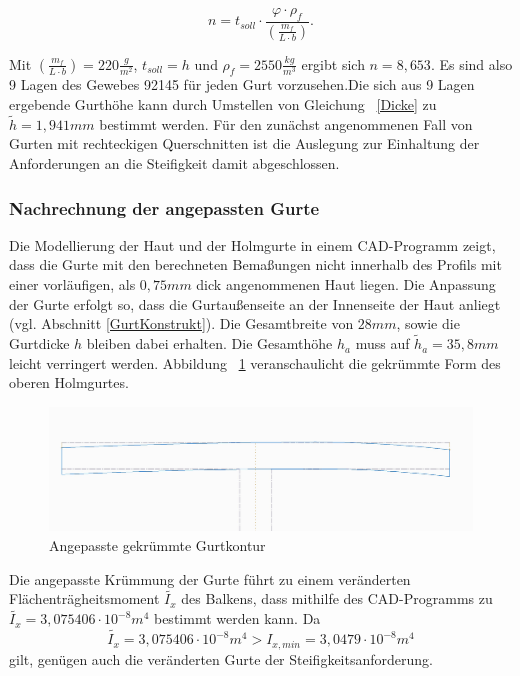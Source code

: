 \begin{equation}\label{Dicke}
	n=t_{soll}\cdot \frac{\varphi\cdot\rho_{f}}{\left(\frac{m_{f}}{L\cdot b}\right)}.
\end{equation}

\noindent Mit $ \left(\frac{m_{f}}{L\cdot b}\right) = 220\frac{g}{m^{2}} $, $ t_{soll}=h $ und $ \rho_{f}=2550\frac{kg}{m^{3}} $ ergibt sich $ n=8,653 $. Es sind also 9 Lagen des Gewebes 92145 für jeden Gurt vorzusehen.Die sich aus 9 Lagen ergebende Gurthöhe kann durch Umstellen von Gleichung ~\ref{Dicke} zu $ \tilde{h}=1,941mm $ bestimmt werden. Für den zunächst angenommenen Fall von Gurten mit rechteckigen Querschnitten ist die Auslegung zur Einhaltung der Anforderungen an die Steifigkeit damit abgeschlossen.\\


\subsubsection{Nachrechnung der angepassten Gurte} \label{NachrechnungGurte}
 Die Modellierung der Haut und der Holmgurte in einem CAD-Programm zeigt, dass die Gurte mit den berechneten Bemaßungen nicht innerhalb des Profils mit einer vorläufigen, als $ 0,75mm $ dick angenommenen Haut liegen. Die Anpassung der Gurte erfolgt so, dass die Gurtaußenseite an der Innenseite der Haut anliegt (vgl. Abschnitt \ref{GurtKonstrukt}). Die Gesamtbreite von $ 28mm $, sowie die Gurtdicke $ h $ bleiben dabei erhalten. Die Gesamthöhe $ h_{a} $ muss auf $ \tilde{h}_{a}=35,8mm $ leicht verringert werden. Abbildung ~\ref{fig: KrummerGurt} veranschaulicht die gekrümmte Form des oberen Holmgurtes.
 \begin{figure}[h]
 	\includegraphics[width=1.0\textwidth]{Bilder/KrummerGurt.jpg}
 	\caption{Angepasste gekrümmte Gurtkontur}
 	\label{fig: KrummerGurt}
 \end{figure}

\noindent Die angepasste Krümmung der Gurte führt zu einem veränderten Flächenträgheitsmoment $ \tilde{I_{x}} $ des Balkens, dass mithilfe des CAD-Programms zu $ \tilde{I_{x}}=3,075406\cdot 10^{-8}m^{4} $ bestimmt werden kann. Da 
\begin{equation}
	\label{IVergleich}
	\tilde{I_{x}}=3,075406\cdot 10^{-8}m^{4} > I_{x,min}=3,0479\cdot 10^{-8}m^{4}
\end{equation}
gilt, genügen auch die veränderten Gurte der Steifigkeitsanforderung.\\
 
